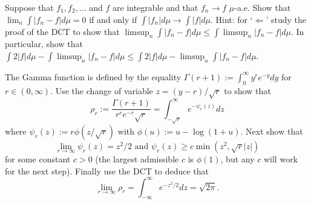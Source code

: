 %





\begin{exercise}
Suppose that $f_1, f_2, \ldots$ and $f$ are integrable and that $f_n\rightarrow f$ $\mu$-a.e. Show that $\lim_n \int |f_n - f|d\mu=0$ if and only if $\int |f_n| d\mu\rightarrow \int |f|d\mu$. Hint: for `$\Leftarrow$' study the proof of the DCT to show that $\limsup_n\int |f_n - f|d\mu\leq \int \limsup_n |f_n-f|d\mu$. In particular, show that $\int 2|f|d\mu -\int \limsup_n|f_n-f|d\mu\leq \int 2|f|d\mu - \limsup_n\int|f_n-f|d\mu $.
\end{exercise}

\begin{exercise}
The Gamma function is defined by the equality $\Gamma(r+1):=\int_0^\infty y^r e^{-y} dy$ for $r\in(0,\infty)$. Use the change of variable $z=(y-r)/\sqrt{r}$ to show that
\[ \rho_r:= \frac{\Gamma(r+1)}{r^{r} e^{-r}\sqrt{r}} = \int_{-\sqrt{r}}^\infty e^{-\psi_r(z)}dz \]
where $\psi_r(z):=r\phi(z/\sqrt{r})$ with $\phi(u):= u -\log(1+u)$. Next show that
\[ \lim_{r\rightarrow \infty} \psi_r(z)=z^2/2\text{  and  }\psi_r(z)\geq c\min(z^2,\sqrt{r}|z|) \]
for some constant $c>0$ (the largest admissible $c$ is $\phi(1)$, but any $c$ will work for the next step). Finally use the DCT to deduce that
\[ \lim_{r\rightarrow\infty} \rho_r= \int_{-\infty}^\infty e^{-z^2/2}dz = \sqrt{2\pi}. \]
\end{exercise}





